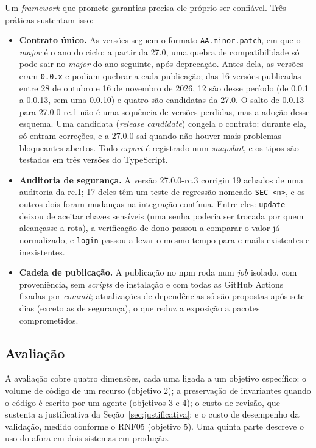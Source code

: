 \documentclass[a4paper,12pt]{article}
\newcommand{\estr}[1]{\textit{#1}}
\begin{document}
Um \estr{framework} que promete garantias precisa ele próprio ser confiável. Três práticas sustentam isso:
\begin{itemize}
  \item \textbf{Contrato único.} As versões seguem o formato \texttt{AA.minor.patch}, em que o \estr{major} é o ano do ciclo; a partir da 27.0, uma quebra de compatibilidade só pode sair no \estr{major} do ano seguinte, após deprecação. Antes dela, as versões eram \texttt{0.0.x} e podiam quebrar a cada publicação; das 16 versões publicadas entre 28 de outubro e 16 de novembro de 2026, 12 são desse período (de 0.0.1 a 0.0.13, sem uma 0.0.10) e quatro são candidatas da 27.0. O salto de 0.0.13 para 27.0.0-rc.1 não é uma sequência de versões perdidas, mas a adoção desse esquema. Uma candidata (\estr{release candidate}) congela o contrato: durante ela, só entram correções, e a 27.0.0 sai quando não houver mais problemas bloqueantes abertos. Todo \estr{export} é registrado num \estr{snapshot}, e os tipos são testados em três versões do TypeScript.
  \item \textbf{Auditoria de segurança.} A versão 27.0.0-rc.3 corrigiu 19 achados de uma auditoria da rc.1; 17 deles têm um teste de regressão nomeado \texttt{SEC-<n>}, e os outros dois foram mudanças na integração contínua. Entre eles: \texttt{update} deixou de aceitar chaves sensíveis (uma senha poderia ser trocada por quem alcançasse a rota), a verificação de dono passou a comparar o valor já normalizado, e \texttt{login} passou a levar o mesmo tempo para e-mails existentes e inexistentes.
  \item \textbf{Cadeia de publicação.} A publicação no npm roda num \estr{job} isolado, com proveniência, sem \estr{scripts} de instalação e com todas as GitHub Actions fixadas por \estr{commit}; atualizações de dependências só são propostas após sete dias (exceto as de segurança), o que reduz a exposição a pacotes comprometidos.
\end{itemize}

\subsection{Avaliação}

A avaliação cobre quatro dimensões, cada uma ligada a um objetivo específico: o volume de código de um recurso (objetivo 2); a preservação de invariantes quando o código é escrito por um agente (objetivos 3 e 4); o custo de revisão, que sustenta a justificativa da Seção~\ref{sec:justificativa}; e o custo de desempenho da validação, medido conforme o RNF05 (objetivo 5). Uma quinta parte descreve o uso do afora em dois sistemas em produção.
\end{document}
